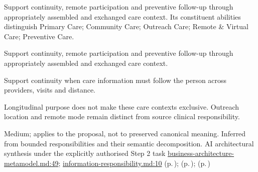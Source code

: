 Support continuity, remote participation and preventive follow-up through appropriately assembled and exchanged care context. Its constituent abilities distinguish Primary Care; Community Care; Outreach Care; Remote \& Virtual Care; Preventive Care.



Support continuity, remote participation and preventive follow-up through appropriately assembled and exchanged care context.



Support continuity when care information must follow the person across providers, visits and distance.



Longitudinal purpose does not make these care contexts exclusive. Outreach location and remote mode remain distinct from source clinical responsibility.


Medium; applies to the proposal, not to preserved canonical meaning.
Inferred from bounded responsibilities and their semantic decomposition. AI architectural synthesis under the explicitly authorised Step 2 task \hyperref[evidence:4bac85accd34ce0b]{business-architecture-metamodel.md:49}; \hyperref[evidence:be61392fefb4bb10]{information-responsibility.md:10}
 (p.\,\pageref{cap:bec-patient-clinical-record});  (p.\,\pageref{cap:bec-care-plan-administration});  (p.\,\pageref{cap:bec-client-centred-administration})
